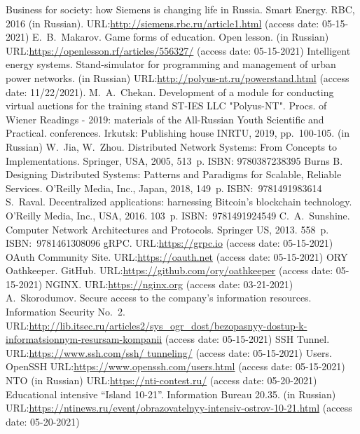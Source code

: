 \documentclass[
]{ceurart}
\begin{document}
\begin{thebibliography}{99}
    Business for society: how Siemens is changing life in Russia. Smart Energy. RBC, 2016 (in Russian). URL:\url{http://siemens.rbc.ru/article1.html} (access date: 05-15-2021)
    E.~B.~Makarov. Game forms of education. Open lesson. (in Russian) URL:\url{https://openlesson.rf/articles/556327/} (access date: 05-15-2021)
    Intelligent energy systems. Stand-simulator for programming and management of urban power networks. (in Russian) URL:\url{http://polyus-nt.ru/powerstand.html} (access date: 11/22/2021).
    M.~A.~Chekan. Development of a module for conducting virtual auctions for the training stand ST-IES LLC "Polyus-NT". Procs. of Wiener Readings - 2019: materials of the All-Russian Youth Scientific and Practical. conferences. Irkutsk: Publishing house INRTU, 2019,  pp.~100-105. (in Russian)
    W.~Jia, W.~Zhou. Distributed Network Systems: From Concepts to Implementations. Springer, USA, 2005, 513~p. ISBN: 9780387238395
    Burns B. Designing Distributed Systems: Patterns and Paradigms for Scalable, Reliable Services. O'Reilly Media, Inc., Japan, 2018, 149~p. ISBN:~9781491983614
    S.~Raval. Decentralized applications: harnessing Bitcoin's blockchain technology.  O'Reilly Media, Inc., USA, 2016. 103~p. ISBN:~9781491924549
    C.~A.~Sunshine. Computer Network Architectures and Protocols. Springer US, 2013. 558~p. ISBN:~9781461308096
    gRPC. URL:\url{https://grpc.io} (access date: 05-15-2021)
    OAuth Community Site. URL:\url{https://oauth.net} (access date: 05-15-2021)
    ORY Oathkeeper. GitHub. URL:\url{https://github.com/ory/oathkeeper} (access date: 05-15-2021)
    NGINX. URL:\url{https://nginx.org} (access date: 03-21-2021)
    A.~Skorodumov. Secure access to the company's information resources.  Information Security No.~2. URL:\url{http://lib.itsec.ru/articles2/sys_ogr_dost/bezopasnyy-dostup-k-informatsionnym-resursam-kompanii} (access date: 05-15-2021)
    SSH Tunnel. URL:\url{https://www.ssh.com/ssh/ tunneling/} (access date: 05-15-2021)
    Users. OpenSSH URL:\url{https://www.openssh.com/users.html} (access date: 05-15-2021)
    NTO (in Russian) URL:\url{https://nti-contest.ru/} (access date: 05-20-2021)
    Educational intensive ``Island 10-21''. Information Bureau 20.35. (in Russian) URL:\url{https://ntinews.ru/event/obrazovatelnyy-intensiv-ostrov-10-21.html} (access date: 05-20-2021)

\end{thebibliography}
\end{document}

